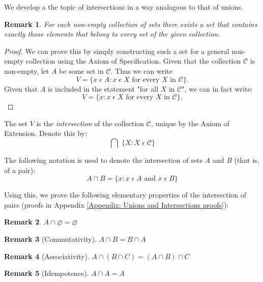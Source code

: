 \documentclass[12pt]{article}
\newtheorem{remark}{Remark}
\begin{document}
We develop a the topic of intersections in a way analagous to that of unions.
\begin{remark}
    For each non-empty collection of sets there exists a set that contains exactly those elements that
    belong to every set of the given collection.
\end{remark}
\begin{proof}
    We can prove this by simply constructing such a set for a general non-empty collection using the Axiom of Specification.
    Given that the collection $\mathcal{C}$ is non-empty, let $A$ be some set in $\mathcal{C}$.
    Thus we can write
    \begin{equation*}
        V = \{x\;\epsilon\;A: x\;\epsilon\;X \text{ for every } X\text{ in } \mathcal{C}\}.
    \end{equation*}
    Given that $A$ is included in the statement "for all $X$ in $\mathcal{C}$", we can in fact write:
    \begin{equation}
        V = \{x: x\;\epsilon\;X \text{ for every } X\text{ in } \mathcal{C}\}.
    \end{equation}
\end{proof}
The set $V$ is the \textit{intersection} of the collection $\mathcal{C}$, unique by the Axiom of Extension.
Denote this by:
\begin{equation}
    \bigcap\;\{X:X\;\epsilon\;\mathcal{C}\}
\end{equation}

The following notation is used to denote the intersection of sets $A$ and $B$ (that is, of a pair):
\begin{equation}
    A \cap B = \{x:x\;\epsilon\;A \text{ and } x\;\epsilon\;B\}
\end{equation}

Using this, we prove the following elementary properties of the intersection of pairs (proofs in Appendix \ref{Appendix: Unions and Intersections proofs}):
\begin{remark}
    $A \cap\varnothing = \varnothing$
\end{remark}

\begin{remark}[Commutativity]
    $A \cap B = B \cap A$
\end{remark}

\begin{remark}[Associativity]
    $A \cap (B \cap C) = (A \cap B) \cap C$
\end{remark}

\begin{remark}[Idempotence]
    $A \cap A = A$
\end{remark}
\end{document}
